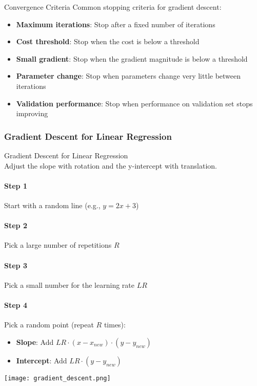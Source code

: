 \multend

\begin{concept}{Convergence Criteria}
Common stopping criteria for gradient descent:
\begin{itemize}
    \item \textbf{Maximum iterations}: Stop after a fixed number of iterations
    \item \textbf{Cost threshold}: Stop when the cost is below a threshold
    \item \textbf{Small gradient}: Stop when the gradient magnitude is below a threshold
    \item \textbf{Parameter change}: Stop when parameters change very little between iterations
    \item \textbf{Validation performance}: Stop when performance on validation set stops improving
\end{itemize}
\end{concept}

\raggedcolumns
\columnbreak

\subsubsection{Gradient Descent for Linear Regression}

\begin{KR}{Gradient Descent for Linear Regression}\\
Adjust the slope with rotation and the y-intercept with translation.

\paragraph{Step 1}
Start with a random line (e.g., $y = 2x + 3$)

\paragraph{Step 2}
Pick a large number of repetitions $R$

\paragraph{Step 3}
Pick a small number for the learning rate $LR$

\paragraph{Step 4}
Pick a random point (repeat $R$ times):
\begin{itemize}
    \item \textbf{Slope}: Add $LR \cdot (x - x_{new}) \cdot (y - y_{new})$
    \item \textbf{Intercept}: Add $LR \cdot (y - y_{new})$
\end{itemize}
\end{KR}

\texttt{[image: gradient\_descent.png]}